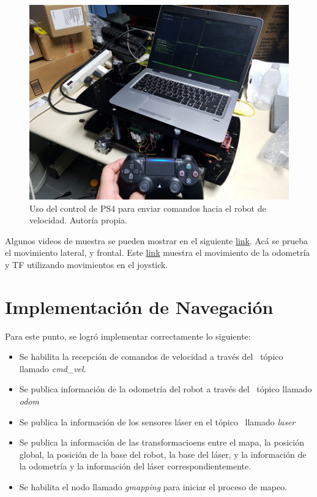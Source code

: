 \begin{figure}[H]
\centering
\includegraphics[scale=0.5]{imagenes/ds4omni.jpg}
\caption{Uso del control de PS4 para enviar comandos hacia el robot de velocidad. Autoría propia. }
\label{F:omnips4}
\end{figure}

Algunos videos de muestra se pueden mostrar en el siguiente \href{https://photos.app.goo.gl/rTe4iRubT16syikD7}{link}. Acá se prueba el movimiento lateral, y frontal. Este \href{https://photos.app.goo.gl/8TJrwLLdDjtWyVjg7}{link} muestra el movimiento de la odometría y TF utilizando movimientos en el joystick.

\section{Implementación de Navegación}

Para este punto, se logró implementar correctamente lo siguiente:

\begin{itemize}
\item Se habilita la recepción de comandos de velocidad a través del \
  tópico llamado \textit{cmd\_vel}.
\item Se publica información de la odometría del robot a través del \
  tópico llamado \textit{odom}
\item Se publica la información de los sensores láser en el tópico \
  llamado \textit{laser}
\item Se publica la información de las transformacioens entre el mapa,
  la posición global, la posición de la base del robot, la base del láser,
  y la información de la odometría y la información del láser correspondientemente.
\item Se habilita el nodo llamado \textit{gmapping} para iniciar el
  proceso de mapeo.
\end{itemize}

